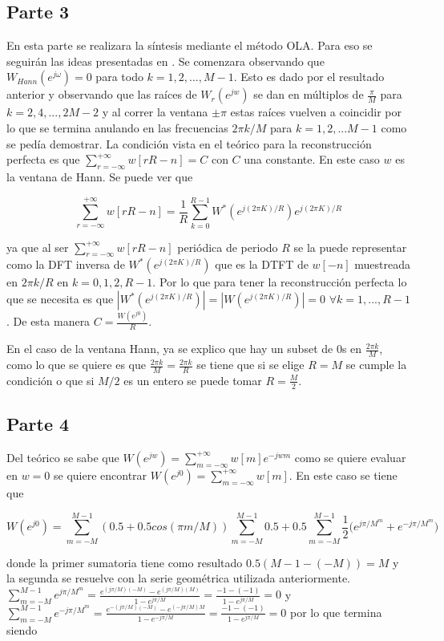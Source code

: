 \documentclass[a4paper]{article}
\begin{document}
\subsection{Parte 3}
En esta parte se realizara la síntesis mediante el método OLA. Para eso se seguirán las ideas presentadas en \cite{RS2}. 
Se comenzara observando que $W_{Hann}(e^{j\omega}) = 0$ para todo $k=1,2,...,M-1$. Esto es dado por el resultado anterior y observando que las raíces de $W_r(e^{jw})$ se dan en múltiplos de $\frac{\pi}{M}$  para $k = 2,4,...,2M-2$ y al correr la ventana $\pm \pi$ estas raíces vuelven a coincidir por lo que se termina anulando en las frecuencias $2 \pi k /M$ para $k = 1,2,...M-1$ como se pedía demostrar. La condición vista en el teórico para la reconstrucción perfecta es que $\sum_{r = -\infty}^{+\infty}w[rR-n]=C$ con $C$ una constante. En este caso $w$ es la ventana de Hann. Se puede ver que 

$$\sum_{r = -\infty}^{+\infty}w[rR-n] = \frac{1}{R}\sum_{k=0}^{R-1}W^*(e^{j(2 \pi K)/R})e^{j(2 \pi K)/R}$$

ya que al ser $\sum_{r = -\infty}^{+\infty}w[rR-n]$ periódica de periodo $R$ se la puede representar como la DFT inversa de $W^*(e^{j(2 \pi K)/R})$ que es la DTFT de $w[-n]$ muestreada en $2 \pi k /R$ en $k = 0,1,2, R-1$. Por lo que para tener la reconstrucción perfecta lo que se necesita es que $|W^*(e^{j(2 \pi K)/R})| = |W(e^{j(2 \pi K)/R})| = 0$ $\forall k = 1,...,R-1$. De esta manera $C = \frac{W(e^{j0})}{R}$.

En el caso de la ventana Hann, ya se explico que hay un subset de 0s en $\frac{2\pi k}{M}$, como lo que se quiere es que $\frac{2\pi k}{M} = \frac{2\pi k}{R}$ se tiene que si se elige $R=M$ se cumple la condición o que si $M/2$ es un entero se puede tomar $R = \frac{M}{2}$.

\subsection{Parte 4}
Del teórico se sabe que $W(e^{jw}) = \sum_{m=-\infty}^{+\infty}w[m]e^{-jwm}$
como se quiere evaluar en $w=0$ se quiere encontrar
$W(e^{j0}) = \sum_{m=-\infty}^{+\infty}w[m]$. 
En este caso se tiene que 

$$W(e^{j0}) = \sum_{m=-M}^{M-1}(0.5+0.5cos(\pi m / M)) \sum_{m=-M}^{M-1}0.5+0.5\sum_{m=-M}^{M-1}\frac{1}{2}\bigg(e^{j\pi /M}^m + e^{-j\pi /M}^m  \bigg)$$

donde la primer sumatoria tiene como resultado $0.5(M-1-(-M)) = M$ y la segunda se resuelve con la serie geométrica utilizada anteriormente. $\sum_{m=-M}^{M-1}e^{j\pi /M}^m = \frac{e^{(j\pi /M)(-M)} - e^{(j\pi /M)(M)}}{1-e^{j\pi /M}} = \frac{-1-(-1)}{1-e^{j\pi /M}} = 0$ y $\sum_{m=-M}^{M-1}e^{-j\pi /M}^m = \frac{e^{-(j\pi /M)(-M)} - e^{(-j\pi /M)M}}{1-e^{-j\pi /M}} = \frac{-1-(-1)}{1-e^{j\pi /M}} = 0$
por lo que termina siendo 
\end{document}

